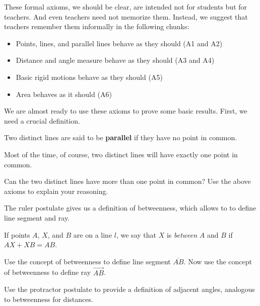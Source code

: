 \bigskip

These formal axioms, we should be clear, are intended not for students but for teachers.  And even teachers need not 
memorize them.  Instead, we suggest that teachers remember them informally in the following chunks:  

\begin{itemize}
\itemsep0em
\item Points, lines, and parallel lines behave as they should (A1 and A2) 
\item Distance and angle measure behave as they should (A3 and A4)
\item Basic rigid motions behave as they should (A5)
\item Area behaves as it should (A6)
\end{itemize}

We are almost ready to use these axioms to prove some basic results.  First, we need a crucial definition.  
\begin{definition}
Two distinct lines are said to be \textbf{parallel} if they have no point in common.
\end{definition}

Most of the time, of course, two distinct lines will have exactly one point in common.  

\begin{question}
Can the two distinct lines have more than one point in common?  Use the above axioms to explain your reasoning.  
\end{question}
\QM


The ruler postulate gives us a definition of betweenness, which allows to to define line segment and ray.    

\begin{definition}
If points $A$, $X$, and $B$ are on a line $l$, we say that $X$ is \emph{between} $A$ and $B$ if $AX + XB = AB$.
\end{definition}

\begin{question}
Use the concept of betweenness to define line segment $\overline{AB}$.  Now use the concept of betweenness to define ray $\overrightarrow{AB}$. 
\end{question}
\QM

\begin{question}
Use the protractor postulate to provide a definition of adjacent angles, analogous to betweenness for distances.  
\end{question}
\QM

